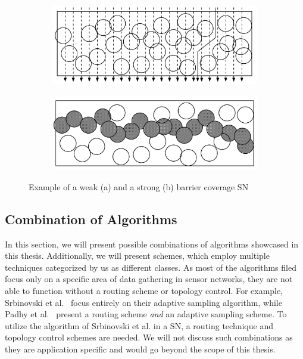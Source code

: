 \begin{figure}
\begin{subfigure}{.5\textwidth}
  \centering
  \includegraphics[width=.8\linewidth]{images/weak-coverage.png}
  \caption{}
  \label{fig:weak}
\end{subfigure}%
\begin{subfigure}{.5\textwidth}
  \centering
  \includegraphics[width=.8\linewidth]{images/strong-coverage.png}
  \caption{}
  \label{fig:strong}
\end{subfigure}
\caption{Example of a weak (a) and a strong (b) barrier coverage \ac{SN}}
\label{fig:coverage}
\end{figure}

\FloatBarrier

\subsection{Combination of Algorithms}
\label{sec:Combination of Algorithms}

In this section, we will present possible combinations of algorithms showcased
in this thesis. Additionally, we will present schemes, which employ multiple
techniques categorized by us as different classes. As most of the algorithms
filed focus only on a specific area of data gathering in sensor networks, they
are not able to function without a routing scheme or topology control. For
example, Srbinovski et al.~\cite{srbinovski2016energy} focus entirely on their
adaptive sampling algorithm, while Padhy et al.~\cite{padhy2006utility} present
a routing scheme \textit{and} an adaptive sampling scheme. To utilize the
algorithm of Srbinovski et al. in a \ac{SN}, a routing technique and topology
control schemes are needed. We will not discuss such combinations as they are
application specific and would go beyond the scope of this thesis.

